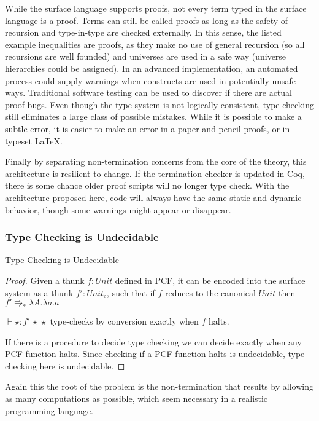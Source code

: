 
While the surface language supports proofs, not every term typed in the surface language is a proof.
Terms can still be called proofs as long as the safety of recursion and type-in-type are checked externally.
In this sense, the listed example inequalities are proofs, as they make no use of general recursion (so all recursions are well founded) and universes are used in a safe way (universe hierarchies could be assigned).
In an advanced implementation, an automated process could supply warnings when constructs are used in potentially unsafe ways.
Traditional software testing can be used to discover if there are actual proof bugs.
Even though the type system is not logically consistent, type checking still eliminates a large class of possible mistakes.
While it is possible to make a subtle error, it is easier to make an error in a paper and pencil proofs, or in typeset \LaTeX.

Finally by separating non-termination concerns from the core of the theory, this architecture is resilient to change.
If the termination checker is updated in Coq, there is some chance older proof scripts will no longer type check.
With the architecture proposed here, code will always have the same static and dynamic behavior, though some warnings might appear or disappear.

\subsubsection{Type Checking is Undecidable}
\begin{thm}
Type Checking is Undecidable
\end{thm}

\begin{proof}
Given a thunk $f:Unit$ defined in PCF, it can be encoded into the surface system as a thunk $f':Unit_{c}$, such that if $f$ reduces to the canonical $Unit$ then $f'\Rrightarrow_{\ast}\lambda A.\lambda a.a$ 

$\vdash\star:f'\,\star\,\star$ type-checks by conversion exactly when $f$ halts.

If there is a procedure to decide type checking we can decide exactly when any PCF function halts.
Since checking if a PCF function halts is undecidable, type checking here is undecidable.

\end{proof}
Again this the root of the problem is the non-termination that results by allowing as many computations as possible, which seem necessary in a realistic programming language.


